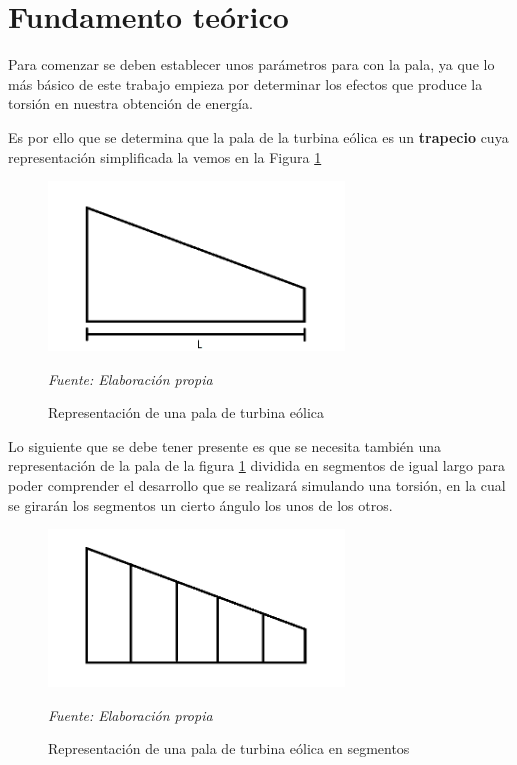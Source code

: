 \section{Fundamento teórico}

Para comenzar se deben establecer unos parámetros para con la pala, ya que lo más básico de este trabajo empieza por determinar los efectos que produce la torsión en nuestra obtención de energía.

Es por ello que se determina que la pala de la turbina eólica es un \textbf{trapecio} cuya representación simplificada la vemos en la Figura \ref{fig:pala_simp}


\begin{figure}[H]
    \centering
    \includegraphics[width=0.7\textwidth]{images/pala turbina paint.png}
    \caption{Representación de una pala de turbina eólica}
    \textit{Fuente: Elaboración propia}
    \label{fig:pala_simp}
\end{figure}



Lo siguiente que se debe tener presente es que se necesita también una representación de la pala de la figura \ref{fig:pala_simp} dividida en segmentos de igual largo para poder comprender el desarrollo que se realizará simulando una torsión, en la cual se girarán los segmentos un cierto ángulo los unos de los otros.

    \textbf{}
    \begin{figure}[H]
    \centering
    \includegraphics[width=0.7\textwidth]{images/pala dividida.png}
    \caption{Representación de una pala de turbina eólica en segmentos}
    \textit{Fuente: Elaboración propia}
    \label{fig:pala_dividida}
\end{figure}

